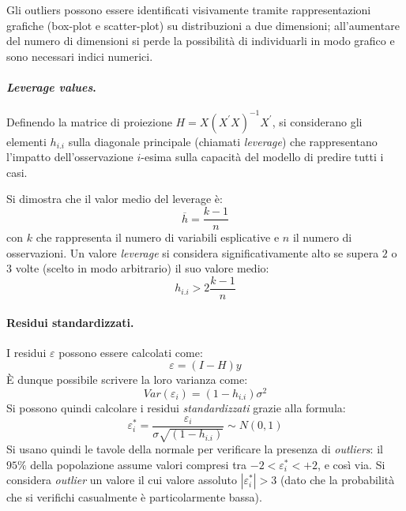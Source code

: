 \documentclass[a4page, 11pt]{article} %
\begin{document}
Gli outliers possono essere identificati visivamente tramite rappresentazioni grafiche (box-plot e scatter-plot) su distribuzioni a due dimensioni; all'aumentare del numero di dimensioni si perde la possibilità di individuarli in modo grafico e sono necessari indici numerici.

\paragraph{\textit{Leverage values}.} Definendo la matrice di proiezione $H = X(X^{\prime}X)^{-1}X^\prime$, si considerano gli elementi $h_{i.i}$ sulla diagonale principale (chiamati \textit{leverage}) che rappresentano l'impatto dell'osservazione $i$-esima sulla capacità del modello di predire tutti i casi.

Si dimostra che il valor medio del leverage è:
\begin{equation*} 
\overline{h} = \frac{k - 1}{n}
\end{equation*}
con $k$ che rappresenta il numero di variabili esplicative e $n$ il numero di osservazioni.
Un valore \textit{leverage} si considera significativamente alto se supera $2$ o $3$ volte (scelto in modo arbitrario) il suo valore medio:
\begin{equation*}
h_{i.i} > 2\frac{k - 1}{n}
\end{equation*}

\paragraph{Residui standardizzati.} I residui $\varepsilon$ possono essere calcolati come:
\begin{equation*}
\varepsilon = (I-H)y
\end{equation*}
È dunque possibile scrivere la loro varianza come:
\begin{equation*}
Var(\varepsilon_i) = (1 - h_{i.i})\sigma^2
\end{equation*}
Si possono quindi calcolare i residui \textit{standardizzati} grazie alla formula:
\begin{equation*}
\varepsilon_i^* = \frac{\varepsilon_i}{\sigma \sqrt{(1-h_{i.i})}} \sim N(0, 1)
\end{equation*}
Si usano quindi le tavole della normale per verificare la presenza di \textit{outliers}: il $95\%$ della popolazione assume valori compresi tra $-2 < \varepsilon_i^* < +2$, e così via.
Si considera \textit{outlier} un valore il cui valore assoluto $|\varepsilon_i^*| > 3$ (dato che la probabilità che si verifichi casualmente è particolarmente bassa).
\end{document}
